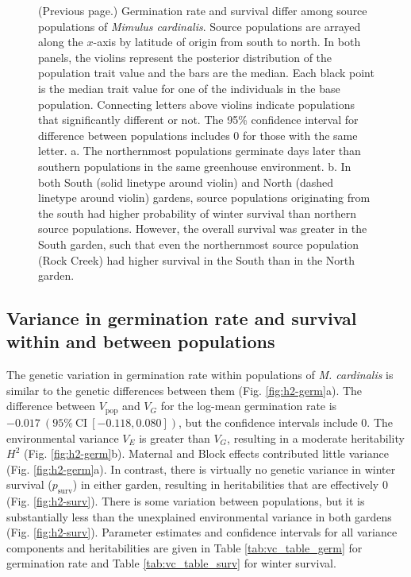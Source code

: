 \documentclass[
  12pt,
]{article}
\begin{document}
\begin{figure} [t!]
  \caption{(Previous page.) Germination rate and survival differ among source populations of \textit{Mimulus cardinalis}. Source populations are arrayed along the $x$-axis by latitude of origin from south to north. In both panels, the violins represent the posterior distribution of the population trait value and the bars are the median. Each black point is the median trait value for one of the individuals in the base population. Connecting letters above violins indicate populations that significantly different or not. The 95\% confidence interval for difference between populations includes 0 for those with the same letter. a. The northernmost populations germinate days later than southern populations in the same greenhouse environment. b. In both South (solid linetype around violin) and North (dashed linetype around violin) gardens, source populations originating from the south had higher probability of winter survival than northern source populations. However, the overall survival was greater in the South garden, such that even the northernmost source population (Rock Creek) had higher survival in the South than in the North garden.}
\end{figure}

\hypertarget{variance-in-germination-rate-and-survival-within-and-between-populations}{%
\subsection{Variance in germination rate and survival within and between populations}\label{variance-in-germination-rate-and-survival-within-and-between-populations}}

The genetic variation in germination rate within populations of \emph{M. cardinalis} is similar to the genetic differences between them (Fig. \ref{fig:h2-germ}a). The difference between \(V_\text{pop}\) and \(V_G\) for the log-mean germination rate is \(-0.017~(95\%~\text{CI}~[-0.118, 0.080])\), but the confidence intervals include \(0\). The environmental variance \(V_E\) is greater than \(V_G\), resulting in a moderate heritability \(H^2\) (Fig. \ref{fig:h2-germ}b). Maternal and Block effects contributed little variance (Fig. \ref{fig:h2-germ}a). In contrast, there is virtually no genetic variance in winter survival (\(p_\text{surv}\)) in either garden, resulting in heritabilities that are effectively \(0\) (Fig. \ref{fig:h2-surv}). There is some variation between populations, but it is substantially less than the unexplained environmental variance in both gardens (Fig. \ref{fig:h2-surv}). Parameter estimates and confidence intervals for all variance components and heritabilities are given in Table \ref{tab:vc_table_germ} for germination rate and Table \ref{tab:vc_table_surv} for winter survival.
\end{document}
